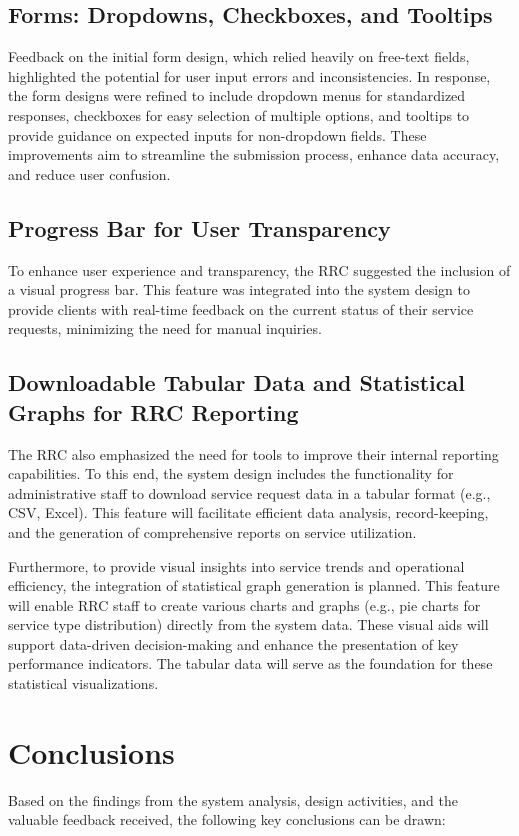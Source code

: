 \subsection{Forms: Dropdowns, Checkboxes, and Tooltips}
Feedback on the initial form design, which relied heavily on free-text fields, highlighted the potential for user input errors and inconsistencies. In response, the form designs were refined to include dropdown menus for standardized responses, checkboxes for easy selection of multiple options, and tooltips to provide guidance on expected inputs for non-dropdown fields. These improvements aim to streamline the submission process, enhance data accuracy, and reduce user confusion.

\subsection{Progress Bar for User Transparency}
To enhance user experience and transparency, the RRC suggested the inclusion of a visual progress bar. This feature was integrated into the system design to provide clients with real-time feedback on the current status of their service requests, minimizing the need for manual inquiries.

\subsection{Downloadable Tabular Data and Statistical Graphs for RRC Reporting}
The RRC also emphasized the need for tools to improve their internal reporting capabilities. To this end, the system design includes the functionality for administrative staff to download service request data in a tabular format (e.g., CSV, Excel). This feature will facilitate efficient data analysis, record-keeping, and the generation of comprehensive reports on service utilization.

Furthermore, to provide visual insights into service trends and operational efficiency, the integration of statistical graph generation is planned. This feature will enable RRC staff to create various charts and graphs (e.g., pie charts for service type distribution) directly from the system data. These visual aids will support data-driven decision-making and enhance the presentation of key performance indicators. The tabular data will serve as the foundation for these statistical visualizations.

\section{Conclusions}
Based on the findings from the system analysis, design activities, and the valuable feedback received, the following key conclusions can be drawn:


